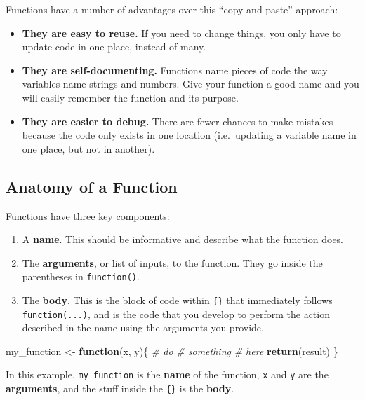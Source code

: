 \documentclass[]{book}
\newenvironment{Shaded}{\begin{snugshade}}{\end{snugshade}}
\newcommand{\KeywordTok}[1]{\textcolor[rgb]{0.13,0.29,0.53}{\textbf{#1}}}
\newcommand{\StringTok}[1]{\textcolor[rgb]{0.31,0.60,0.02}{#1}}
\newcommand{\CommentTok}[1]{\textcolor[rgb]{0.56,0.35,0.01}{\textit{#1}}}
\newcommand{\ControlFlowTok}[1]{\textcolor[rgb]{0.13,0.29,0.53}{\textbf{#1}}}
\newcommand{\NormalTok}[1]{#1}
\providecommand{\tightlist}{%
  \setlength{\itemsep}{0pt}\setlength{\parskip}{0pt}}
\begin{document}
Functions have a number of advantages over this ``copy-and-paste''
approach:

\begin{itemize}
\item
  \textbf{They are easy to reuse.} If you need to change things, you
  only have to update code in one place, instead of many.
\item
  \textbf{They are self-documenting.} Functions name pieces of code the
  way variables name strings and numbers. Give your function a good name
  and you will easily remember the function and its purpose.
\item
  \textbf{They are easier to debug.} There are fewer chances to make
  mistakes because the code only exists in one location (i.e.~updating a
  variable name in one place, but not in another).
\end{itemize}

\subsection{Anatomy of a Function}\label{anatomy-of-a-function}

Functions have three key components:

\begin{enumerate}
\def\labelenumi{\arabic{enumi}.}
\tightlist
\item
  A \textbf{name}. This should be informative and describe what the
  function does.
\item
  The \textbf{arguments}, or list of inputs, to the function. They go
  inside the parentheses in \texttt{function()}.
\item
  The \textbf{body}. This is the block of code within \texttt{\{\}} that
  immediately follows \texttt{function(...)}, and is the code that you
  develop to perform the action described in the name using the
  arguments you provide.
\end{enumerate}

\begin{Shaded}
\begin{Highlighting}[]
\NormalTok{my_function <-}\StringTok{ }\ControlFlowTok{function}\NormalTok{(x, y)\{}
  \CommentTok{# do}
  \CommentTok{# something}
  \CommentTok{# here}
  \KeywordTok{return}\NormalTok{(result)}
\NormalTok{\}}
\end{Highlighting}
\end{Shaded}

In this example, \texttt{my\_function} is the \textbf{name} of the
function, \texttt{x} and \texttt{y} are the \textbf{arguments}, and the
stuff inside the \texttt{\{\}} is the \textbf{body}.
\end{document}
